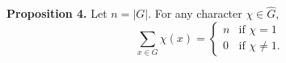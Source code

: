 \textbf{Proposition 4.} Let $n = |G|$. For any character $\chi \in \hat{G}$,
$$\sum_{x \in G} \chi(x) = \begin{cases} n & \text{if } \chi = 1 \\ 0 & \text{if } \chi \neq 1. \end{cases}$$

